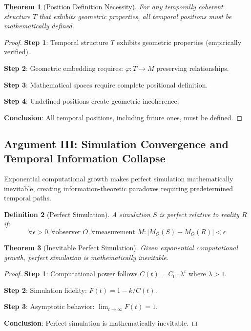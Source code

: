 \documentclass[11pt]{article}
\newtheorem{theorem}{Theorem}[section]
\newtheorem{definition}[theorem]{Definition}
\theoremstyle{remark}
\begin{document}
\begin{theorem}[Position Definition Necessity]
For any temporally coherent structure $T$ that exhibits geometric properties, all temporal positions must be mathematically defined.
\end{theorem}

\begin{proof}
\textbf{Step 1}: Temporal structure $T$ exhibits geometric properties (empirically verified).

\textbf{Step 2}: Geometric embedding requires: $\varphi: T \to M$ preserving relationships.

\textbf{Step 3}: Mathematical spaces require complete positional definition.

\textbf{Step 4}: Undefined positions create geometric incoherence.

\textbf{Conclusion}: All temporal positions, including future ones, must be defined.
\end{proof}

\subsection{Argument III: Simulation Convergence and Temporal Information Collapse}

Exponential computational growth makes perfect simulation mathematically inevitable, creating information-theoretic paradoxes requiring predetermined temporal paths.

\begin{definition}[Perfect Simulation]
A simulation $S$ is perfect relative to reality $R$ if:
$$\forall \epsilon > 0, \forall \text{observer } O, \forall \text{measurement } M: |M_O(S) - M_O(R)| < \epsilon$$
\end{definition}

\begin{theorem}[Inevitable Perfect Simulation]
Given exponential computational growth, perfect simulation is mathematically inevitable.
\end{theorem}

\begin{proof}
\textbf{Step 1}: Computational power follows $C(t) = C_0 \cdot \lambda^t$ where $\lambda > 1$.

\textbf{Step 2}: Simulation fidelity: $F(t) = 1 - k/C(t)$.

\textbf{Step 3}: Asymptotic behavior: $\lim_{t \to \infty} F(t) = 1$.

\textbf{Conclusion}: Perfect simulation is mathematically inevitable.
\end{proof}
\end{document}
